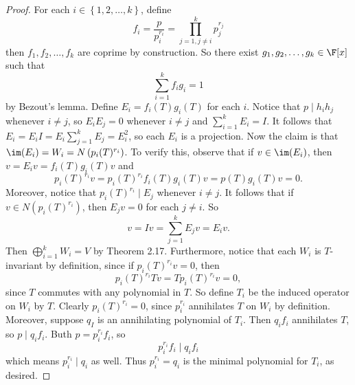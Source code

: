 \documentclass[math_245.tex]{subfiles}
\begin{document}
    \begin{proof}
        For each $i\in \left\lbrace 1, 2, \ldots, k \right\rbrace$, define
        \begin{equation*}
            f_i = \frac{p}{p_i^{r_i}} = \prod^{k}_{j=1,j\neq i} p_j^{r_j}
        \end{equation*}
        then $f_1, f_2, \ldots, f_k$ are coprime by construction. So there exist $g_1, g_2, \ldots, g_k\in \F[x]$ such that
        \begin{equation*}
            \sum^{k}_{i=1} f_ig_i = 1
        \end{equation*}
        by Bezout's lemma. Define $E_i = f_i(T)g_i(T)$ for each $i$. Notice that $p\mid h_ih_j$ whenever $i\neq j$, so $E_iE_j = 0$ whenever $i\neq j$ and $\sum^{k}_{i=1} E_i = I$. It follows that $E_i = E_iI = E_i \sum^{k}_{j=1} E_j = E_i^2$, so each $E_i$ is a projection. Now the claim is that $\im(E_i) = W_i = N \left( p_i(T)^{r_i} \right)$. To verify this, observe that if $v\in \im(E_i)$, then $v = E_iv = f_i(T)g_i(T)v$ and
        \begin{equation*}
            p_i(T)^{r_i}v = p_i(T)^{r_i}f_i(T)g_i(T)v = p(T)g_i(T)v = 0.
        \end{equation*}
        Moreover, notice that $p_i(T)^{r_i}\mid E_j$ whenever $i\neq j$. It follows that if $v\in N \left( p_i(T)^{r_i} \right)$, then $E_jv = 0$ for each $j\neq i$. So
        \begin{equation*}
            v = Iv = \sum^{k}_{j=1} E_jv = E_iv.
        \end{equation*}
        Then $\bigoplus^{k}_{i=1} W_i = V$ by Theorem 2.17. Furthermore, notice that each $W_i$ is $T$-invariant by definition, since if $p_i(T)^{r_i}v = 0$, then
        \begin{equation*}
            p_i(T)^{r_i}Tv = Tp_i(T)^{r_i}v = 0,
        \end{equation*}
        since $T$ commutes with any polynomial in $T$. So define $T_i$ be the induced operator on $W_i$ by $T$. Clearly $p_i(T)^{r_i} = 0$, since $p_i^{r_i}$ annihilates $T$ on $W_i$ by definition. Moreover, suppose $q_I$ is an annihilating polynomial of $T_i$. Then $q_if_i$ annihilates $T$, so $p\mid q_if_i$. Buth $p = p_i^{r_i}f_i$, so
        \begin{equation*}
            p_i^{r_i}f_i\mid q_if_i
        \end{equation*}
        which means $p_i^{r_i}\mid q_i$ as well. Thus $p_i^{r_i} = q_i$ is the minimal polynomial for $T_i$, as desired.
    \end{proof}
\end{document}
